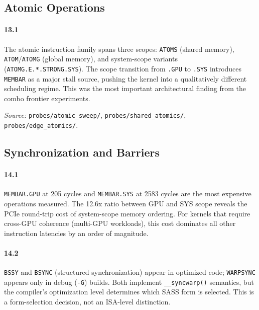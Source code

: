 \subsection{Atomic Operations}
\label{par:atomic}

\paragraph{13.1}
The atomic instruction family spans three scopes: \texttt{ATOMS} (shared
memory), \texttt{ATOM}/\texttt{ATOMG} (global memory), and system-scope
variants (\texttt{ATOMG.E.*.STRONG.SYS}).  The scope transition from
\texttt{.GPU} to \texttt{.SYS} introduces \texttt{MEMBAR} as a major
stall source, pushing the kernel into a qualitatively different scheduling
regime.  This was the most important architectural finding from the combo
frontier experiments.

\textit{Source:} \texttt{probes/atomic\_sweep/},
\texttt{probes/shared\_atomics/}, \texttt{probes/edge\_atomics/}.

\subsection{Synchronization and Barriers}
\label{par:sync}

\paragraph{14.1}
\texttt{MEMBAR.GPU} at 205 cycles and \texttt{MEMBAR.SYS} at 2583 cycles
are the most expensive operations measured.  The 12.6x ratio between GPU
and SYS scope reveals the PCIe round-trip cost of system-scope memory
ordering.  For kernels that require cross-GPU coherence (multi-GPU
workloads), this cost dominates all other instruction latencies by an
order of magnitude.

\paragraph{14.2}
\texttt{BSSY} and \texttt{BSYNC} (structured synchronization) appear in
optimized code; \texttt{WARPSYNC} appears only in debug (\texttt{-G})
builds.  Both implement \texttt{\_\_syncwarp()} semantics, but the
compiler's optimization level determines which SASS form is selected.
This is a form-selection decision, not an ISA-level distinction.

